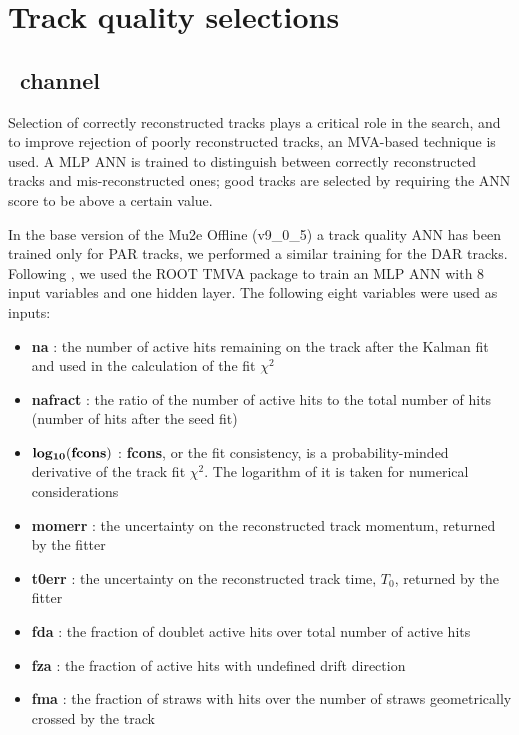 

\section{Track quality selections}

\subsection{\MuToEm\  channel}
\label{sec:mumem_channel}

Selection of correctly reconstructed tracks plays a critical role in the search, and 
to improve rejection of poorly reconstructed  tracks, an MVA-based technique is used.
A MLP ANN is trained to distinguish between correctly reconstructed tracks and mis-reconstructed
ones; good tracks are selected by requiring the ANN score to be above a certain value.

In the base version of the Mu2e Offline (v9\_0\_5) a track quality ANN has been trained only for PAR tracks,
we performed a similar training for the DAR tracks.
%
Following \cite{MU2E_4595_ANN_TRAINING}, we used the ROOT TMVA package to train an 
MLP ANN with 8 input variables and one hidden layer. The following eight variables
were used as inputs:

\begin{itemize}
\item
  {\bf na } : the number of active hits remaining on the track 
  after the Kalman fit and used in the calculation of the fit $\chi^2$
\item
  {\bf nafract} : the ratio of the number of active hits to the total number
  of hits (number of hits after the seed fit)
\item
  ${\bf log_{10}(fcons)}$ : {\bf fcons}, or the fit consistency, 
  is a probability-minded derivative of the track fit $\chi^2$. The logarithm
  of it is taken for numerical considerations
\item
  {\bf momerr} : the uncertainty on the reconstructed track momentum, returned by the fitter
\item
  {\bf t0err} : the uncertainty on the reconstructed track time, $T_0$, returned by the fitter
\item
  {\bf fda} : the fraction of doublet active hits over total number of active hits
\item
  {\bf fza } : the fraction of active hits with undefined drift direction
\item
  {\bf fma } : the fraction of straws with hits over the number of straws geometrically crossed by the track
\end{itemize}

